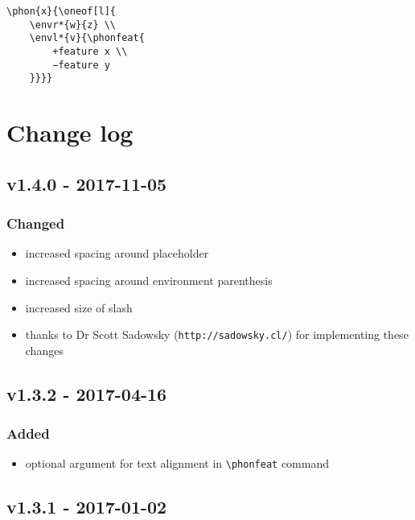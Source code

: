 \documentclass[a4paper]{article}
\begin{document}
\begin{exe}
\ex
\begin{lstlisting}
\phon{x}{\oneof[l]{
    \envr*{w}{z} \\
    \envl*{v}{\phonfeat{
        +feature x \\
        −feature y
    }}}}
\end{lstlisting}
\ex {}
\end{exe}

\section{Change log}

\subsection*{v1.4.0 - 2017-11-05}
\subsubsection*{Changed}
\begin{itemize}
    \item increased spacing around placeholder
    \item increased spacing around environment parenthesis
    \item increased size of slash
    \item thanks to Dr Scott Sadowsky (\texttt{http://sadowsky.cl/}) for implementing these changes
\end{itemize}

\subsection*{v1.3.2 - 2017-04-16}
\subsubsection*{Added}
\begin{itemize}
    \item optional argument for text alignment in \verb+\phonfeat+ command
\end{itemize}

\subsection*{v1.3.1 - 2017-01-02}
\end{document}
